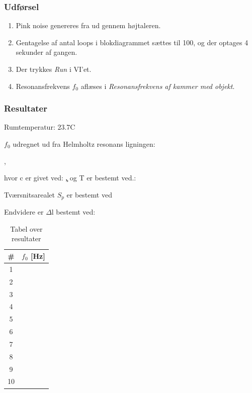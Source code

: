		\subsubsection{Udførsel}
			
			\begin{enumerate}
			\item Pink noise genereres fra \onlineg  ud gennem højtaleren. 
			\item Gentagelse af antal loops i blokdiagrammet sættes til 100, og der optages 4 sekunder af gangen. 
			\item Der trykkes \textit{Run} i VI'et. 
			\item Resonansfrekvens $f_{0}$ aflæses i \textit{Resonansfrekvens af kammer med objekt}.
			\end{enumerate}
			
	\subsubsection{Resultater}
	
	Rumtemperatur: 23.7\degree C
	
	$f_{0}$ udregnet ud fra Helmholtz resonans ligningen:
	
		\fnul,
		
		hvor c er givet ved: 
		\c, og T er bestemt ved.: 
		\T
		
		Tværsnitsarealet $S_{p}$ er bestemt ved
		\Sp
		
		Endvidere er $\Delta$l bestemt ved: 
		\deltal
		\Sp
	
	

	
	
			
		\begin{table}[]
\centering
\caption{Tabel over resultater}
\label{bordtest6resultater}
\begin{tabular}{c|l}
\textbf{\#}& \textbf{$f_{0}$ {[Hz]}} \\
\hline
1  &                  \\
2  &                  \\
3  &                  \\
4  &                  \\
5  &                  \\
6  &                  \\
7  &                  \\
8  &                  \\
9  &                  \\
10 &                 
\end{tabular}
\end{table}
			

